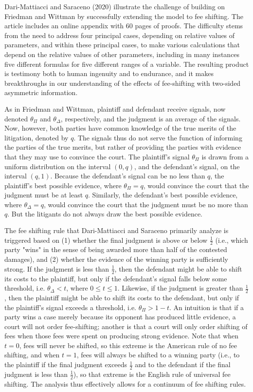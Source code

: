 \documentclass{article}
\begin{document}
Dari-Mattiacci and Saraceno (2020) illustrate the challenge of building on Friedman and Wittman by successfully extending the model to fee shifting. The article includes an online appendix with 60 pages of proofs. The difficulty stems from the need to address four principal cases, depending on relative values of parameters, and within these principal cases, to make various calculations that depend on the relative values of other parameters, including in many instances five different formulas for five different ranges of a variable. The resulting product is testimony both to human ingenuity and to endurance, and it makes breakthroughs in our understanding of the effects of fee-shifting with two-sided asymmetric information.

As in Friedman and Wittman, plaintiff and defendant receive signals, now denoted $\theta_\Pi$ and $\theta_\Delta$, respectively, and the judgment is an average of the signals. Now, however, both parties have common knowledge of the true merits of the litigation, denoted by $q$. The signals thus do not serve the function of informing the parties of the true merits, but rather of providing the parties with evidence that they may use to convince the court. The plaintiff's signal $\theta_\Pi$ is drawn from a uniform distribution on the interval $(0,q)$, and the defendant's signal, on the interval $(q,1)$. Because the defendant's signal can be no less than $q$, the plaintiff's best possible evidence, where $\theta_\Pi = q$, would convince the court that the judgment must be at least $q$. Similarly, the defendant's best possible evidence, where $\theta_\Delta = q$, would convince the court that the judgment must be no more than $q$. But the litigants do not always draw the best possible evidence.

The fee shifting rule that Dari-Mattiacci and Saraceno primarily analyze is triggered based on (1) whether the final judgment is above or below $\frac{1}{2}$ (i.e., which party "wins" in the sense of being awarded more than half of the contested damages), and (2) whether the evidence of the winning party is sufficiently strong. If the judgment is less than $\frac{1}{2}$, then the defendant might be able to shift its costs to the plaintiff, but only if the defendant's signal falls below some threshold, i.e. $\theta_\Delta < t$, where $0 \leq t \leq 1$. Likewise, if the judgment is greater than $\frac{1}{2}$, then the plaintiff might be able to shift its costs to the defendant, but only if the plaintiff's signal exceeds a threshold, i.e. $\theta_\Pi > 1 - t$. An intuition is that if a party wins a case merely because its opponent has produced little evidence, a court will not order fee-shifting; another is that a court will only order shifting of fees when those fees were spent on producing strong evidence. Note that when $t = 0$, fees will never be shifted, so this extreme is the American rule of no fee shifting, and when $t = 1$, fees will always be shifted to a winning party (i.e., to the plaintiff if the final judgment exceeds $\frac{1}{2}$ and to the defendant if the final judgment is less than $\frac{1}{2}$), so that extreme is the English rule of universal fee shifting. The analysis thus effectively allows for a continuum of fee shifting rules.
\end{document}
